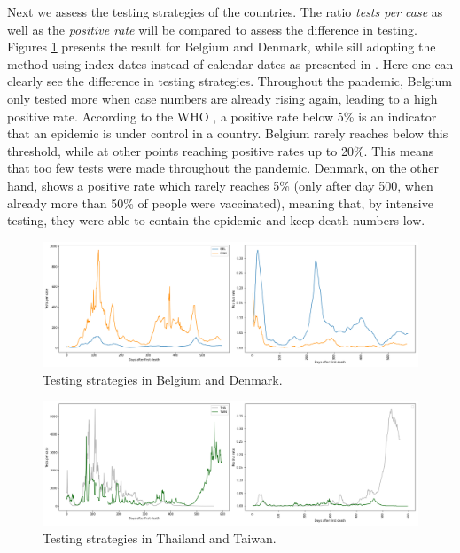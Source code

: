 \documentclass[a4paper,11pt]{article}
\begin{document}
Next we assess the testing strategies of the countries.
The ratio \textit{tests per case} as well as the \textit{positive rate} will be compared to assess the difference in testing. Figures \ref{fig:testing_bel_den} presents the result for Belgium and Denmark, while sill adopting the 
method using index dates instead of calendar dates as presented in \cite{middelburg2020covid}. Here one can clearly see the difference in testing strategies. Throughout the pandemic, Belgium only tested more when case numbers are already rising again, leading to a high positive rate. According to the WHO \cite{world2020public}, a positive rate below 5\% is an indicator that an epidemic is under control in a country. Belgium rarely reaches below this threshold, while at other points reaching positive rates up to 20\%. This means that too few tests were made throughout the pandemic. Denmark, on the other hand, shows a positive rate which rarely reaches 5\% (only after day 500, when already more than 50\% of people were vaccinated), meaning that, by intensive testing, they were able to contain the epidemic and keep death numbers low.

\begin{figure}[htb]
    \centering
    \includegraphics[width=\textwidth]{figures/testing_bel_dnk.png}
    \caption{Testing strategies in Belgium and Denmark.}
    \label{fig:testing_bel_den}
\end{figure}

\begin{figure}[htb]
    \centering
    \includegraphics[width=\textwidth]{figures/testing_tha_twn.png}
    \caption{Testing strategies in Thailand and Taiwan.}
    \label{fig:testing_tha_twn}
\end{figure}
\end{document}
